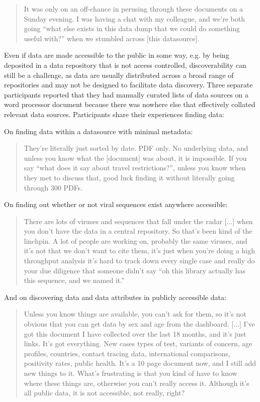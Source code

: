 \documentclass{CUP-JNL-DAP}%
\begin{document}
\blockquote{It was only on an off-chance in perusing through these documents on a Sunday evening. I was having a chat with my colleague,  and we're both going \enquote{what else exists in this data dump that we could do something useful with?} when we stumbled across [this datasource].}

Even if data are made accessible to the public in some way, e.g. by being deposited in a data repository that is not access controlled, discoverability can still be a challenge, as data are usually distributed across a broad range of repositories and may not be designed to facilitate data discovery. Three separate participants reported that they had manually curated lists of data sources on a word processor document because there was nowhere else that effectively collated relevant data sources. Participants share their experiences finding data: 

On finding data within a datasource with minimal metadata:

\blockquote{They're literally just sorted by date. PDF only. No underlying data, and unless you know what the [document] was about, it is impossible. If you say \enquote{what does it say about travel restrictions?}, unless you know when they met to discuss that, good luck finding it without literally going through 300 PDFs.}

On finding out whether or not viral sequences exist anywhere accessible:

\blockquote{There are lots of viruses and sequences that fall under the radar [...] when you don't have the data in a central repository. So that's been kind of the linchpin. A lot of people are working on, probably the same viruses, and it's not that we don't want to cite them, it's just when you're doing a high throughput analysis it's hard to track down every single case and really do your due diligence that someone didn't say \enquote{oh this library actually has this sequence, and we named it.}}

And on discovering data and data attributes in publicly accessible data: 

\blockquote{Unless you know things are available, you can't ask for them, so it's not obvious that you can get data by sex and age from the dashboard. [...] I've got this document I have collected over the last 18 months, and it's just links. It's got everything. New cases types of test, variants of concern, age profiles, countries, contact tracing data, international comparisons, positivity rates, public health. It's a 10 page document now, and I still add new things to it. What's frustrating is that you kind of have to know where these things are, otherwise you can't really access it. Although it's all public data, it is not accessible, not really, right?}
\end{document}
